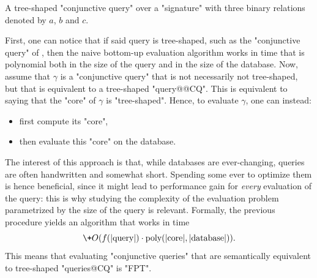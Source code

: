 \begin{marginfigure}
	\centering
	\caption{
		\AP\label{fig:intro-tree-shaped-CQ}
		A tree-shaped "conjunctive query" over a "signature"
		with three binary relations denoted by $a$, $b$ and $c$.
	}
\end{marginfigure}
First, one can notice that if said query is tree-shaped,
such as the "conjunctive query" of , then the naive
bottom-up evaluation algorithm works in time that is polynomial both
in the size of the query and in the size of the database.
Now, assume that $\gamma$ is a "conjunctive query" that is not necessarily
not tree-shaped, but that is equivalent to a tree-shaped "query@@CQ".
This is equivalent to saying that the "core" of $\gamma$ is "tree-shaped".
Hence, to evaluate $\gamma$, one can instead:
\begin{itemize}
	\item first compute its "core",
	\item then evaluate this "core" on the database.
\end{itemize}
The interest of this approach is that, while databases are ever-changing,
queries are often handwritten and somewhat short. Spending some ever to optimize
them is hence beneficial, since it might lead to performance gain
for \emph{every} evaluation of the query: this is why studying the
complexity of the evaluation problem parametrized by the size of
the query is relevant.
Formally, the previous procedure yields an algorithm that works in time
\[
	\+O(f(|\text{query}|) \cdot \text{poly}(|\text{core}|, |\text{database}|)).
\]
This means that evaluating "conjunctive queries" that are semantically equivalent to
tree-shaped "queries@CQ" is "FPT".

